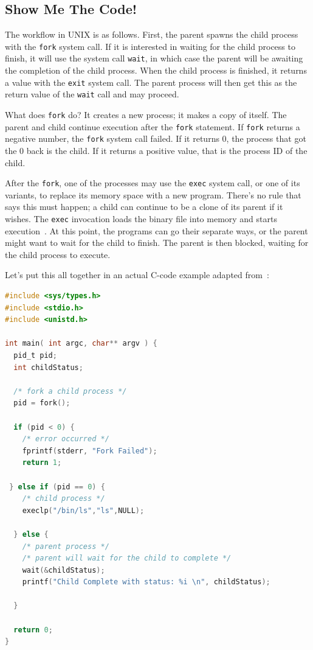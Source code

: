 \subsection*{Show Me The Code!}

The workflow in UNIX is as follows. First, the parent spawns the child process with the \texttt{fork} system call. If it is interested in waiting for the child process to finish, it will use the system call \texttt{wait}, in which case the parent will be awaiting the completion of the child process. When the child process is finished, it returns a value with the \texttt{exit} system call. The parent process will then get this as the return value of the \texttt{wait} call and may proceed.

What does \texttt{fork} do? It creates a new process; it makes a copy of itself. The parent and child continue execution after the \texttt{fork} statement. If \texttt{fork} returns a negative number, the \texttt{fork} system call failed. If it returns 0, the process that got the 0 back is the child. If it returns a positive value, that is the process ID of the child.

After the \texttt{fork}, one of the processes may use the \texttt{exec} system call, or one of its variants, to replace its memory space with a new program. There's no rule that says this must happen; a child can continue to be a clone of its parent if it wishes. The \texttt{exec} invocation loads the binary file into memory and starts execution~\cite{osc}. At this point, the programs can go their separate ways, or the parent might want to wait for the child to finish. The parent is then blocked, waiting for the child process to execute.

Let's put this all together in an actual C-code example adapted from~\cite{osc}:

\begin{lstlisting}[language=C]
#include <sys/types.h>
#include <stdio.h> 
#include <unistd.h>

int main( int argc, char** argv ) {
  pid_t pid;
  int childStatus;

  /* fork a child process */
  pid = fork();
  
  if (pid < 0) { 
    /* error occurred */ 
    fprintf(stderr, "Fork Failed"); 
    return 1;
  
 } else if (pid == 0) {    
    /* child process */
    execlp("/bin/ls","ls",NULL);
    
  } else {    
    /* parent process */
    /* parent will wait for the child to complete */
    wait(&childStatus);
    printf("Child Complete with status: %i \n", childStatus);
    
  }
    
  return 0;
}
\end{lstlisting}

